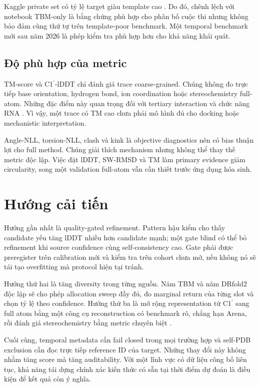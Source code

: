 \documentclass[12pt,a4paper,oneside]{report}
\newcommand{\cprime}{C1$^{\prime}$}
\begin{document}
Kaggle private set có tỷ lệ target giàu template cao
\cite{competition_paper}. Do đó, chênh lệch với notebook TBM-only là bằng chứng phù hợp
cho phân bố cuộc thi nhưng không bảo đảm cùng thứ tự trên template-poor benchmark. Một
temporal benchmark mới sau năm 2026 là phép kiểm tra phù hợp hơn cho khả năng khái quát.

\subsection{Độ phù hợp của metric}

TM-score và \cprime{}-lDDT chỉ đánh giá trace coarse-grained. Chúng không đo trực tiếp
base orientation, hydrogen bond, ion coordination hoặc stereochemistry full-atom.
Những đặc điểm này quan trọng đối với tertiary interaction và chức năng RNA
\cite{butcher_tertiary,cao_rna_functions}. Vì vậy, một trace có TM cao chưa phải mô hình
đủ cho docking hoặc mechanistic interpretation.

Angle-NLL, torsion-NLL, clash và kink là objective diagnostics nên có bias thuận lợi cho
full method. Chúng giải thích mechanism nhưng không thể thay thế metric độc lập. Việc
đặt lDDT, SW-RMSD và TM làm primary evidence giảm circularity, song một validation
full-atom vẫn cần thiết trước ứng dụng hóa sinh.

\section{Hướng cải tiến}

Hướng gần nhất là quality-gated refinement. Pattern hậu kiểm cho thấy candidate yếu tăng
lDDT nhiều hơn candidate mạnh; một gate blind có thể bỏ refinement khi source confidence
cùng self-consistency cao. Gate phải được preregister trên calibration mới và kiểm tra
trên cohort chưa mở, nếu không nó sẽ tái tạo overfitting mà protocol hiện tại tránh.

Hướng thứ hai là tăng diversity trong từng nguồn. Năm TBM và năm DRfold2 độc lập sẽ cho
phép allocation sweep đầy đủ, đo marginal return của từng slot và chọn tỷ lệ theo
confidence. Hướng thứ ba là mở rộng representation từ \cprime{} sang full atom bằng một
công cụ reconstruction có benchmark rõ, chẳng hạn Arena, rồi đánh giá stereochemistry
bằng metric chuyên biệt \cite{arena,rna_puzzles_toolkit}.

Cuối cùng, temporal metadata cần fail closed trong mọi trường hợp và self-PDB exclusion
cần đọc trực tiếp reference ID của target. Những thay đổi này không nhằm tăng score mà
tăng auditability. Với một lĩnh vực có dữ liệu công bố liên tục, khả năng tái dựng chính
xác kiến thức có sẵn tại thời điểm dự đoán là điều kiện để kết quả còn ý nghĩa.
\end{document}
